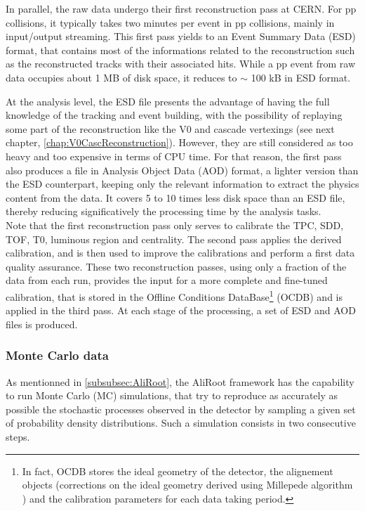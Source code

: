 In parallel, the raw data undergo their first reconstruction pass at CERN. For pp collisions, it typically takes two minutes per event in pp collisions, mainly in input/output streaming. This first pass yields to an Event Summary Data (ESD) format, that  contains most of the informations related to the reconstruction such as the reconstructed tracks with their associated hits. While a pp event from raw data occupies about 1 MB of disk space, it reduces to $\sim$ 100 kB in ESD format. 

At the analysis level, the ESD file presents the advantage of having the full knowledge of the tracking and event building, with the possibility of replaying some part of the reconstruction like the V0 and cascade vertexings (see next chapter, \chap\ref{chap:V0CascReconstruction}). However, they are still considered as too heavy and too expensive in terms of CPU time. For that reason, the first pass also produces a file in Analysis Object Data (AOD) format, a lighter version than the ESD counterpart, keeping only the relevant information to extract the physics content from the data. It covers 5 to 10 times less disk space than an ESD file, thereby reducing significatively the processing time by the analysis tasks.\\

Note that the first reconstruction pass only serves to calibrate the TPC, SDD, TOF, T0, luminous region and centrality. The second pass applies the derived calibration, and is then used to improve the calibrations and perform a first data quality assurance. These two reconstruction passes, using only a fraction of the data from each run, provides the input for a more complete and fine-tuned calibration, that is stored in the Offline Conditions DataBase\footnote{In fact, OCDB stores the ideal geometry of the detector,  the alignement objects (\ie corrections on the ideal geometry derived using Millepede algorithm \cite{blobelNewMethodHighPrecision2002}) and the calibration parameters for each data taking period.} (OCDB) and is applied in the third pass. At each stage of the processing, a set of ESD and AOD files is produced. 

\subsubsection{Monte Carlo data}
\label{subsubsec:MCData}

As mentionned in \Sec\ref{subsubsec:AliRoot}, the AliRoot framework has the capability to run Monte Carlo (MC) simulations, that try to reproduce as accurately as possible the stochastic processes observed in the detector by sampling a given set of probability density distributions. Such a simulation consists in two consecutive steps.

